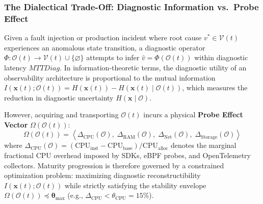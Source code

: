 \subsubsection{The Dialectical Trade-Off: Diagnostic Information vs.\ Probe Effect}
Given a fault injection or production incident where root cause $v^* \in \mathcal{V}(t)$ experiences an anomalous state transition, a diagnostic operator $\Phi: \mathcal{O}(t) \rightarrow \mathcal{V}(t) \cup \{\varnothing\}$ attempts to infer $\hat{v} = \Phi(\mathcal{O}(t))$ within diagnostic latency $MTTDiag$. In information-theoretic terms, the diagnostic utility of an observability architecture is proportional to the mutual information $I(\mathbf{x}(t); \mathcal{O}(t)) = H(\mathbf{x}(t)) - H(\mathbf{x}(t) \mid \mathcal{O}(t))$, which measures the reduction in diagnostic uncertainty $H(\mathbf{x} \mid \mathcal{O})$.

However, acquiring and transporting $\mathcal{O}(t)$ incurs a physical \textbf{Probe Effect Vector} $\Omega(\mathcal{O}(t))$:
\begin{equation}
    \Omega(\mathcal{O}(t)) = \left\langle \Delta_{\text{CPU}}(\mathcal{O}), \; \Delta_{\text{RAM}}(\mathcal{O}), \; \Delta_{\text{Net}}(\mathcal{O}), \; \Delta_{\text{Storage}}(\mathcal{O}) \right\rangle
    \label{eq:probe_effect}
\end{equation}
where $\Delta_{\text{CPU}}(\mathcal{O}) = (\text{CPU}_{\text{inst}} - \text{CPU}_{\text{base}}) / \text{CPU}_{\text{alloc}}$ denotes the marginal fractional CPU overhead imposed by SDKs, eBPF probes, and OpenTelemetry collectors. Maturity progression is therefore governed by a constrained optimization problem: maximizing diagnostic reconstructibility $I(\mathbf{x}(t); \mathcal{O}(t))$ while strictly satisfying the stability envelope $\Omega(\mathcal{O}(t)) \preceq \boldsymbol{\theta}_{\max}$ (e.g., $\Delta_{\text{CPU}} < \theta_{\text{CPU}} = 15\%$).


